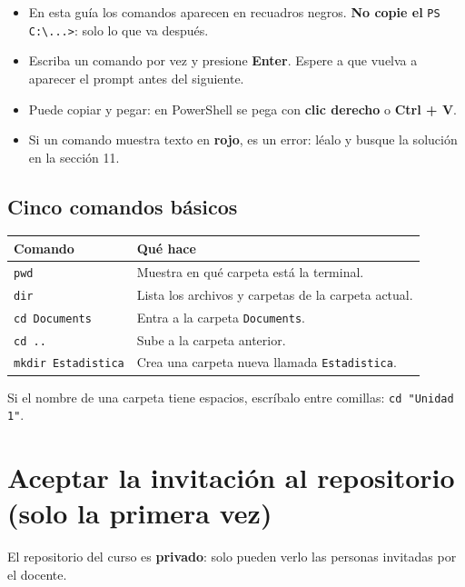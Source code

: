 \documentclass[11pt,a4paper]{article}
\newcommand{\cmd}[1]{\texttt{\textcolor{petroleo}{#1}}}
\begin{document}
\begin{alerta}[title=Reglas para escribir comandos]
\begin{itemize}[leftmargin=*]
  \item En esta guía los comandos aparecen en recuadros negros. \textbf{No copie el} \texttt{PS C:\textbackslash ...>}: solo lo que va después.
  \item Escriba un comando por vez y presione \textbf{Enter}. Espere a que vuelva a aparecer el prompt antes del siguiente.
  \item Puede copiar y pegar: en PowerShell se pega con \textbf{clic derecho} o \textbf{Ctrl + V}.
  \item Si un comando muestra texto en \textcolor{rojo}{\textbf{rojo}}, es un error: léalo y busque la solución en la sección 11.
\end{itemize}
\end{alerta}

\subsection{Cinco comandos básicos}

\begin{center}
\small
\renewcommand{\arraystretch}{1.25}
\begin{tabularx}{\textwidth}{L{3.6cm}Y}
\toprule
\textbf{Comando} & \textbf{Qué hace} \\
\midrule
\cmd{pwd} & Muestra en qué carpeta está la terminal. \\
\cmd{dir} & Lista los archivos y carpetas de la carpeta actual. \\
\cmd{cd Documents} & Entra a la carpeta \texttt{Documents}. \\
\cmd{cd ..} & Sube a la carpeta anterior. \\
\cmd{mkdir Estadistica} & Crea una carpeta nueva llamada \texttt{Estadistica}. \\
\bottomrule
\end{tabularx}
\end{center}

Si el nombre de una carpeta tiene espacios, escríbalo entre comillas: \cmd{cd "Unidad 1"}.

\section{Aceptar la invitación al repositorio (solo la primera vez)}

El repositorio del curso es \textbf{privado}: solo pueden verlo las personas invitadas por el docente.
\end{document}
